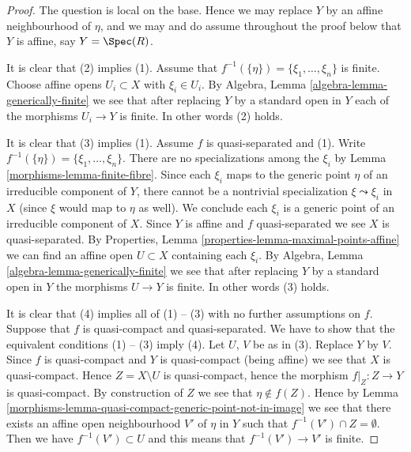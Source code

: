 \begin{proof}

The question is local on the base. Hence we may replace $Y$ by an
affine neighbourhood of $\eta$, and we may and do assume throughout
the proof below that $Y$ is affine, say $Y = \Spec(R)$.

\medskip\noindent
It is clear that (2) implies (1).
Assume that $f^{-1}(\{\eta\}) = \{\xi_1, \ldots, \xi_n\}$ is finite.
Choose affine opens $U_i \subset X$ with $\xi_i \in U_i$.
By Algebra, Lemma \ref{algebra-lemma-generically-finite} we see
that after replacing $Y$ by a standard open in
$Y$ each of the morphisms $U_i \to Y$ is finite.
In other words (2) holds.

\medskip\noindent
It is clear that (3) implies (1). Assume $f$ is quasi-separated and (1).
Write $f^{-1}(\{\eta\}) = \{\xi_1, \ldots, \xi_n\}$. There are no
specializations among the $\xi_i$ by Lemma \ref{morphisms-lemma-finite-fibre}.
Since each $\xi_i$ maps to the generic
point $\eta$ of an irreducible component of $Y$, there cannot be a
nontrivial specialization $\xi \leadsto \xi_i$ in $X$
(since $\xi$ would map to $\eta$ as well).
We conclude each $\xi_i$ is a generic point of an
irreducible component of $X$.
Since $Y$ is affine and $f$ quasi-separated we see $X$ is quasi-separated.
By Properties, Lemma \ref{properties-lemma-maximal-points-affine}
we can find an affine open $U \subset X$ containing each $\xi_i$.
By Algebra, Lemma \ref{algebra-lemma-generically-finite} we see
that after replacing $Y$ by a standard open in
$Y$ the morphisms $U \to Y$ is finite.
In other words (3) holds.

\medskip\noindent
It is clear that (4) implies all of (1) -- (3) with no further assumptions
on $f$. Suppose that $f$ is quasi-compact and quasi-separated. We have to
show that the equivalent conditions (1) -- (3) imply (4).
Let $U$, $V$ be as in (3). Replace $Y$ by $V$. Since $f$ is quasi-compact
and $Y$ is quasi-compact (being affine) we see that $X$ is quasi-compact.
Hence $Z = X \setminus U$ is quasi-compact, hence the morphism
$f|_Z : Z \to Y$ is quasi-compact. By construction of $Z$ we see that
$\eta \not \in f(Z)$. Hence by
Lemma \ref{morphisms-lemma-quasi-compact-generic-point-not-in-image}
we see that there exists an affine open
neighbourhood $V'$ of $\eta$ in $Y$ such that $f^{-1}(V') \cap Z = \emptyset$.
Then we have $f^{-1}(V') \subset U$ and this means
that $f^{-1}(V') \to V'$ is finite.
\end{proof}

